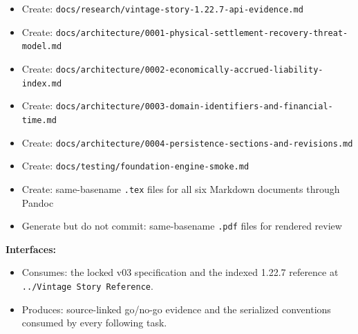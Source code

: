\documentclass[
  10pt,
  letterpaper,
]{article}
\newcommand{\passthrough}[1]{#1}
\providecommand{\tightlist}{%
  \setlength{\itemsep}{0pt}\setlength{\parskip}{0pt}}
\begin{document}
\begin{itemize}
\tightlist
\item
  Create:
  \texttt{docs/}\allowbreak{}\texttt{research/}\allowbreak{}\texttt{vintage-}\allowbreak{}\texttt{story-}\allowbreak{}\texttt{1.}\allowbreak{}\texttt{22.}\allowbreak{}\texttt{7-}\allowbreak{}\texttt{api-}\allowbreak{}\texttt{evidence.}\allowbreak{}\texttt{md}
\item
  Create:
  \texttt{docs/}\allowbreak{}\texttt{architecture/}\allowbreak{}\texttt{0001-}\allowbreak{}\texttt{physical-}\allowbreak{}\texttt{settlement-}\allowbreak{}\texttt{recovery-}\allowbreak{}\texttt{threat-}\allowbreak{}\texttt{model.}\allowbreak{}\texttt{md}
\item
  Create:
  \texttt{docs/}\allowbreak{}\texttt{architecture/}\allowbreak{}\texttt{0002-}\allowbreak{}\texttt{economically-}\allowbreak{}\texttt{accrued-}\allowbreak{}\texttt{liability-}\allowbreak{}\texttt{index.}\allowbreak{}\texttt{md}
\item
  Create:
  \texttt{docs/}\allowbreak{}\texttt{architecture/}\allowbreak{}\texttt{0003-}\allowbreak{}\texttt{domain-}\allowbreak{}\texttt{identifiers-}\allowbreak{}\texttt{and-}\allowbreak{}\texttt{financial-}\allowbreak{}\texttt{time.}\allowbreak{}\texttt{md}
\item
  Create:
  \texttt{docs/}\allowbreak{}\texttt{architecture/}\allowbreak{}\texttt{0004-}\allowbreak{}\texttt{persistence-}\allowbreak{}\texttt{sections-}\allowbreak{}\texttt{and-}\allowbreak{}\texttt{revisions.}\allowbreak{}\texttt{md}
\item
  Create:
  \texttt{docs/}\allowbreak{}\texttt{testing/}\allowbreak{}\texttt{foundation-}\allowbreak{}\texttt{engine-}\allowbreak{}\texttt{smoke.}\allowbreak{}\texttt{md}
\item
  Create: same-basename \passthrough{\lstinline!.tex!} files for all six
  Markdown documents through Pandoc
\item
  Generate but do not commit: same-basename
  \passthrough{\lstinline!.pdf!} files for rendered review
\end{itemize}

\textbf{Interfaces:}

\begin{itemize}
\tightlist
\item
  Consumes: the locked v03 specification and the indexed 1.22.7
  reference at
  \texttt{.}\allowbreak{}\texttt{.}\allowbreak{}\texttt{/}\allowbreak{}\texttt{Vintage\ }\allowbreak{}\texttt{Story\ }\allowbreak{}\texttt{Reference}.
\item
  Produces: source-linked go/no-go evidence and the serialized
  conventions consumed by every following task.
\end{itemize}
\end{document}
